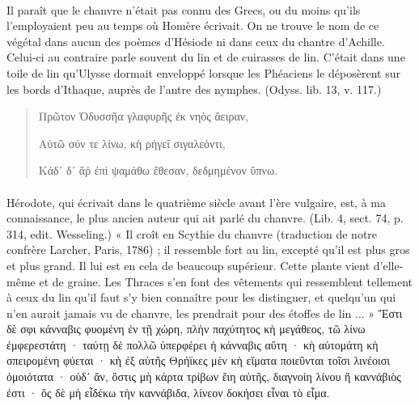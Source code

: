 \documentclass[a4paper, 11pt, oneside, polutonikogreek]{article}
\begin{document}
\paragraph{}
Il paraît que le chanvre n'était pas connu des Grecs, ou du moins qu'ils l'employaient peu au temps où Homère écrivait. On ne trouve le nom de ce végétal dans aucun des poèmes d'Hésiode ni dans ceux du chantre d'Achille. Celui-ci au contraire parle souvent du lin et de cuirasses de lin. C'était dans une toile de lin qu'Ulysse dormait enveloppé lorsque les Phéaciens le déposèrent sur les bords d'Ithaque, auprès de l'antre des nymphes. (Odyss. lib. 13, v. 117.)
\begin{quotation}
Πρῶτον Ὀδυσσῆα γλαφυρῆς ἐκ νηὸς ἄειραν,

Αὐτῶ σύν τε λίνω, κὴ ρήγεΐ σιγαλεόντι,

Κἀδ᾽ δ᾽ ἄῤ ἐπὶ ψαμάθω ἔθεσαν, δεδμημένον ὕπνω.
\end{quotation}
\paragraph{}
Hérodote, qui écrivait dans le quatrième siècle avant l'ère vulgaire, est, à ma connaissance, le plus ancien auteur qui ait parlé du chanvre. (Lib. 4, sect. 74, p. 314, edit. Wesseling.) « Il croît en Scythie du chanvre (traduction de notre confrère Larcher, Paris, 1786) ; il ressemble fort au lin, excepté qu'il est plus gros et plus grand. Il lui est en cela de beaucoup supérieur. Cette plante vient d'elle-même et de graine. Les Thraces s'en font des vêtements qui ressemblent tellement à ceux du lin qu'il faut s'y bien connaître pour les distinguer, et quelqu'un qui n'en aurait jamais vu de chanvre, les prendrait pour des étoffes de lin ... » Ἔστι δὲ σφι κάνναβις φυομένη ἐν τῇ χώρη, πλὴν παχύτητος κὴ μεγάθεος, τῶ λίνω ἐμφερεστάτη · ταύτῃ δὲ πολλῶ ὑπερφέρει ἡ κάνναβις αὕτη · κὴ αὐτομάτη κὴ σπειρομένη φύεται · κὴ ἐξ αὐτῆς Θρήϊκες μὲν κὴ εἵματα ποιεῦνται τοῖσι λινέοισι ὁμοιότατα · οὐδ᾽ ἄν, ὃστις μὴ κάρτα τρίβων ἔιη αὐτῆς, διαγνοίη λίνου ἥ καννάβιὸς ἐστι · ὃς δὲ μὴ εἶδέκω τὴν καννάβιδα, λίνεον δοκήσει εἶναι τὸ εἶμα.
\end{document}
